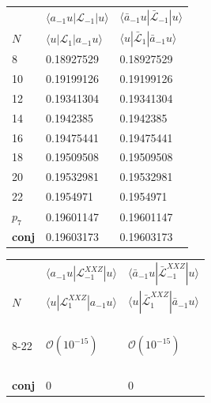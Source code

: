 \documentclass[a4paper,10pt]{article}
\newcommand{\KSgen}{\mathcal{L}}
\begin{document}
\begin{table}[h]
\center
\begin{tabular}{lll}
  \vspace*{5pt}        & $\langle a_{-1}u | \KSgen_{-1} | u \rangle$  & $\langle \bar{a}_{-1}u |\bar{\KSgen}_{-1}| u \rangle$    \\
  $N$    & $\langle u| \KSgen_{1} | a_{-1}u \rangle$  & $\langle u |\bar{\KSgen}_{1}| \bar{a}_{-1}u \rangle$    \\
\hline
8 & 0.18927529 & 0.18927529 \\
10 & 0.19199126 & 0.19199126 \\
12 & 0.19341304 & 0.19341304 \\
14 & 0.1942385 & 0.1942385 \\
16 & 0.19475441 & 0.19475441 \\
18 & 0.19509508 & 0.19509508 \\
20 & 0.19532981 & 0.19532981 \\
22 & 0.1954971 & 0.1954971 \\
$p_7$ & 0.19601147 & 0.19601147 \\
 \textbf{conj} & 0.19603173 & 0.19603173 \\
\hline
\end{tabular}
\hspace*{1cm}
\begin{tabular}{lll}
   \vspace*{5pt}       & $\langle a_{-1}u | \KSgen_{-1}^{XXZ} | u \rangle$  & $\langle \bar{a}_{-1}u |\bar{\KSgen}_{-1}^{XXZ}| u \rangle$    \\
  $N$    & $\langle u| \KSgen_{1}^{XXZ} | a_{-1}u \rangle$  & $\langle u |\bar{\KSgen}_{1}^{XXZ}| \bar{a}_{-1}u \rangle$    \\
 \hline
 \\
  \\
   \\
    \\
8-22 &$ \mathcal{O}(10^{-15})$&$ \mathcal{O}(10^{-15})$\\
\\
 \\
  \\
   \\
 \textbf{conj} & 0 & 0 \\
\hline
\end{tabular}


\vspace*{0.5cm}



\end{table}
\end{document}
